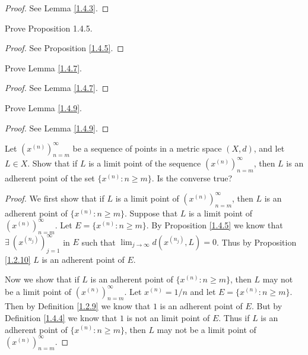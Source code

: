 \begin{proof}
    See Lemma \ref{1.4.3}.
\end{proof}

\begin{exercise}\label{ex 1.4.2}
    Prove Proposition 1.4.5.
\end{exercise}

\begin{proof}
    See Proposition \ref{1.4.5}.
\end{proof}

\begin{exercise}\label{ex 1.4.3}
    Prove Lemma \ref{1.4.7}.
\end{exercise}

\begin{proof}
    See Lemma \ref{1.4.7}.
\end{proof}

\begin{exercise}\label{ex 1.4.4}
    Prove Lemma \ref{1.4.9}.
\end{exercise}

\begin{proof}
    See Lemma \ref{1.4.9}.
\end{proof}

\begin{exercise}\label{ex 1.4.5}
    Let \((x^{(n)})_{n = m}^\infty\) be a sequence of points in a metric space \((X, d)\), and let \(L \in X\).
    Show that if \(L\) is a limit point of the sequence \((x^{(n)})_{n = m}^\infty\), then \(L\) is an adherent point of the set \(\{x^{(n)} : n \geq m\}\).
    Is the converse true?
\end{exercise}

\begin{proof}
    We first show that if \(L\) is a limit point of \((x^{(n)})_{n = m}^\infty\), then \(L\) is an adherent point of \(\{x^{(n)} : n \geq m\}\).
    Suppose that \(L\) is a limit point of \((x^{(n)})_{n = m}^\infty\).
    Let \(E = \{x^{(n)} : n \geq m\}\).
    By Proposition \ref{1.4.5} we know that \(\exists\ (x^{(n_j)})_{j = 1}^\infty\) in \(E\) such that \(\lim_{j \to \infty} d(x^{(n_j)}, L) = 0\).
    Thus by Proposition \ref{1.2.10} \(L\) is an adherent point of \(E\).

    Now we show that if \(L\) is an adherent point of \(\{x^{(n)} : n \geq m\}\), then \(L\) may not be a limit point of \((x^{(n)})_{n = m}^\infty\).
    Let \(x^{(n)} = 1 / n\) and let \(E = \{x^{(n)} : n \geq m\}\).
    Then by Definition \ref{1.2.9} we know that \(1\) is an adherent point of \(E\).
    But by Definition \ref{1.4.4} we know that \(1\) is not an limit point of \(E\).
    Thus if \(L\) is an adherent point of \(\{x^{(n)} : n \geq m\}\), then \(L\) may not be a limit point of \((x^{(n)})_{n = m}^\infty\).
\end{proof}

